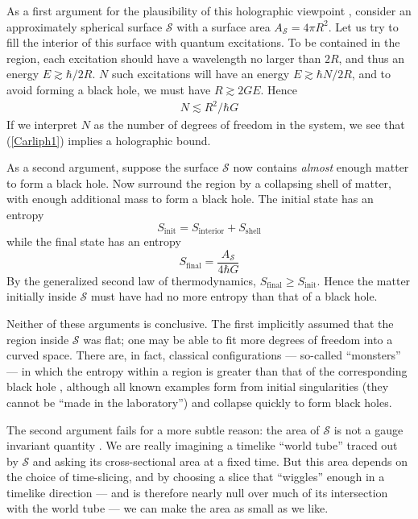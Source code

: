 \documentclass[12pt]{article}
\begin{document}
As a first argument for the plausibility of this holographic viewpoint
\cite{Yurtsever}, consider an approximately spherical surface 
$\mathcal{S}$ with a surface area $A_{\mathcal{S}} = 4\pi R^2$.  
Let us try to fill the interior of this surface with quantum excitations.  
To be contained in the region, each excitation should have a wavelength 
no larger than $2R$, and thus an energy $E\gtrsim \hbar/2R$.  $N$ such
excitations will have an energy $E\gtrsim \hbar N/2R$, and to avoid 
forming a black hole, we must have $R\gtrsim 2GE$.  Hence
\begin{align}
N \lesssim R^2/\hbar G
\label{Carliph1}
\end{align}
If we interpret $N$ as the number of degrees of freedom in the 
system, we see that (\ref{Carliph1}) implies a holographic bound.

As a second argument, suppose the surface $\mathcal{S}$ now
contains \emph{almost} enough matter to form a black hole.
Now surround the region by a collapsing shell of matter, with 
enough additional mass to form a black hole.  The initial state has 
an entropy
$$S_{\scriptscriptstyle\mathrm{init}} = S_{\scriptscriptstyle\mathrm{interior}}
  + S_{\scriptscriptstyle\mathrm{shell}}$$
while the final state has an entropy
$$S_{\scriptscriptstyle\mathrm{final}} = \frac{A_{\mathcal S}}{4\hbar G}$$
By the generalized second law of thermodynamics, 
$S_{\scriptscriptstyle\mathrm{final}}
\ge S_{\scriptscriptstyle\mathrm{init}}$.  Hence the matter initially
inside $\mathcal{S}$ must have had no more entropy than 
that of a black hole.

Neither of these arguments is conclusive.  The first implicitly
assumed that the region inside $\mathcal{S}$ was flat; one may be 
able to fit more degrees of freedom into a curved space. There are, in fact, 
classical configurations --- so-called ``monsters'' 
--- in which the entropy within a region is greater than that of the 
corresponding black hole \cite{Hsu}, although all known examples 
form from initial singularities (they cannot be ``made in the laboratory'') 
and collapse quickly to form black holes.   

The second argument fails for a more subtle reason: the area of
$\mathcal{S}$ is not a gauge invariant quantity \cite{Flanagan,Bousso}.  
We are really imagining a timelike ``world tube'' traced 
out by $\mathcal{S}$ and asking its cross-sectional area at a fixed 
time.  But this area depends on the choice of time-slicing, and by 
choosing a slice that ``wiggles'' enough in a timelike direction --- 
and is therefore nearly null over much of its intersection with the 
world tube --- we can make the area as small as we like.
\end{document}
